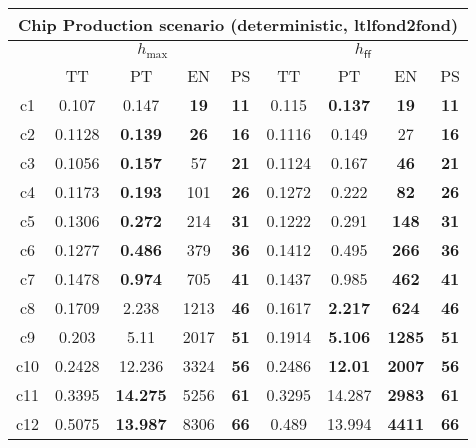 \begin{tabular}{||c||c|c|c|c|c|c|c|c||}%
\multicolumn{9}{c}{\textbf{Chip Production scenario (deterministic, ltlfond2fond)}}\\%
\hline%
&\multicolumn{4}{||c||}{$h_{\max}$}&\multicolumn{4}{||c||}{$h_{\mathsf{ff}}$}\\%
\hline%
&\small{TT}&\small{PT}&\small{EN}&\small{PS}&\small{TT}&\small{PT}&\small{EN}&\small{PS}\\%
\hline%
c1&\small{0.107}&\small{0.147}&\small{\textbf{19}}&\small{\textbf{11}}&\small{0.115}&\small{\textbf{0.137}}&\small{\textbf{19}}&\small{\textbf{11}}\\%
\hline%
c2&\small{0.1128}&\small{\textbf{0.139}}&\small{\textbf{26}}&\small{\textbf{16}}&\small{0.1116}&\small{0.149}&\small{27}&\small{\textbf{16}}\\%
\hline%
c3&\small{0.1056}&\small{\textbf{0.157}}&\small{57}&\small{\textbf{21}}&\small{0.1124}&\small{0.167}&\small{\textbf{46}}&\small{\textbf{21}}\\%
\hline%
c4&\small{0.1173}&\small{\textbf{0.193}}&\small{101}&\small{\textbf{26}}&\small{0.1272}&\small{0.222}&\small{\textbf{82}}&\small{\textbf{26}}\\%
\hline%
c5&\small{0.1306}&\small{\textbf{0.272}}&\small{214}&\small{\textbf{31}}&\small{0.1222}&\small{0.291}&\small{\textbf{148}}&\small{\textbf{31}}\\%
\hline%
c6&\small{0.1277}&\small{\textbf{0.486}}&\small{379}&\small{\textbf{36}}&\small{0.1412}&\small{0.495}&\small{\textbf{266}}&\small{\textbf{36}}\\%
\hline%
c7&\small{0.1478}&\small{\textbf{0.974}}&\small{705}&\small{\textbf{41}}&\small{0.1437}&\small{0.985}&\small{\textbf{462}}&\small{\textbf{41}}\\%
\hline%
c8&\small{0.1709}&\small{2.238}&\small{1213}&\small{\textbf{46}}&\small{0.1617}&\small{\textbf{2.217}}&\small{\textbf{624}}&\small{\textbf{46}}\\%
\hline%
c9&\small{0.203}&\small{5.11}&\small{2017}&\small{\textbf{51}}&\small{0.1914}&\small{\textbf{5.106}}&\small{\textbf{1285}}&\small{\textbf{51}}\\%
\hline%
c10&\small{0.2428}&\small{12.236}&\small{3324}&\small{\textbf{56}}&\small{0.2486}&\small{\textbf{12.01}}&\small{\textbf{2007}}&\small{\textbf{56}}\\%
\hline%
c11&\small{0.3395}&\small{\textbf{14.275}}&\small{5256}&\small{\textbf{61}}&\small{0.3295}&\small{14.287}&\small{\textbf{2983}}&\small{\textbf{61}}\\%
\hline%
c12&\small{0.5075}&\small{\textbf{13.987}}&\small{8306}&\small{\textbf{66}}&\small{0.489}&\small{13.994}&\small{\textbf{4411}}&\small{\textbf{66}}\\%
\hline%
\end{tabular}